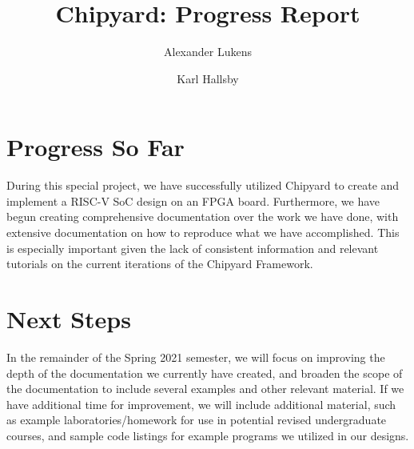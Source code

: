 \documentclass[10pt,letterpaper,final,twoside,notitlepage]{article}
\title{Chipyard: Progress Report}
\author{Alexander Lukens \and Karl Hallsby}
\date{\DTMdisplaydate{2021}{4}{11}{-1}} %
\begin{document}
\maketitle
{} %



\section{Progress So Far} \label{sec:Progress_so_far}

During this special project, we have successfully utilized Chipyard to create and implement a RISC-V SoC design on an FPGA board. Furthermore, we have begun creating comprehensive documentation over the work we have done, with extensive documentation on how to reproduce what we have accomplished. This is especially important given the lack of consistent information and relevant tutorials on the current iterations of the Chipyard Framework.

\section{Next Steps}\label{sec:Next_Steps}

In the remainder of the Spring 2021 semester, we will focus on improving the depth of the documentation we currently have created, and broaden the scope of the documentation to include several examples and other relevant material. If we have additional time for improvement, we will include additional material, such as example laboratories/homework for use in potential revised undergraduate courses, and sample code listings for example programs we utilized in our designs. 





\end{document}
